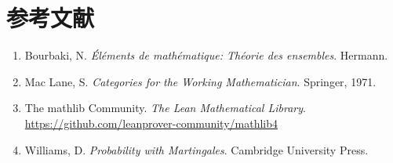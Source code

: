 \documentclass[a4paper,11pt]{ltjsarticle}
\theoremstyle{definition}
\theoremstyle{plain}
\begin{document}
\section*{参考文献}

\begin{enumerate}
  \item Bourbaki, N. \textit{Éléments de mathématique: Théorie des ensembles}. Hermann.
  \item Mac Lane, S. \textit{Categories for the Working Mathematician}. Springer, 1971.
  \item The mathlib Community. \textit{The Lean Mathematical Library}. 
        \url{https://github.com/leanprover-community/mathlib4}
  \item Williams, D. \textit{Probability with Martingales}. Cambridge University Press.
\end{enumerate}
\end{document}
